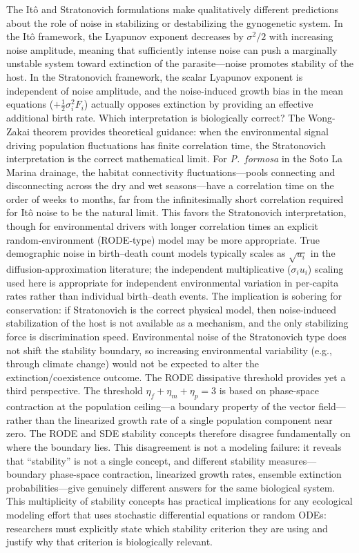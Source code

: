\documentclass[12pt]{article}
\begin{document}
The It\^{o} and Stratonovich formulations make qualitatively different predictions about the role of noise in stabilizing or destabilizing the gynogenetic system.  In the It\^{o} framework, the Lyapunov exponent decreases by $\sigma^2/2$ with increasing noise amplitude, meaning that sufficiently intense noise can push a marginally unstable system toward extinction of the parasite---noise promotes stability of the host.  In the Stratonovich framework, the scalar Lyapunov exponent is independent of noise amplitude, and the noise-induced growth bias in the mean equations ($+\tfrac{1}{2}\sigma_i^2 F_i$) actually opposes extinction by providing an effective additional birth rate.  Which interpretation is biologically correct?  The Wong-Zakai theorem provides theoretical guidance: when the environmental signal driving population fluctuations has finite correlation time, the Stratonovich interpretation is the correct mathematical limit.  For \textit{P.~formosa} in the Soto La Marina drainage, the habitat connectivity fluctuations---pools connecting and disconnecting across the dry and wet seasons---have a correlation time on the order of weeks to months, far from the infinitesimally short correlation required for It\^{o} noise to be the natural limit.  This favors the Stratonovich interpretation, though for environmental drivers with longer correlation times an explicit random-environment (RODE-type) model may be more appropriate.  True demographic noise in birth--death count models typically scales as $\sqrt{u_i}$ in the diffusion-approximation literature; the independent multiplicative ($\sigma_i u_i$) scaling used here is appropriate for independent environmental variation in per-capita rates rather than individual birth--death events.  The implication is sobering for conservation: if Stratonovich is the correct physical model, then noise-induced stabilization of the host is not available as a mechanism, and the only stabilizing force is discrimination speed.  Environmental noise of the Stratonovich type does not shift the stability boundary, so increasing environmental variability (e.g., through climate change) would not be expected to alter the extinction/coexistence outcome.  The RODE dissipative threshold provides yet a third perspective.  The threshold $\eta_f + \eta_m + \eta_p = 3$ is based on phase-space contraction at the population ceiling---a boundary property of the vector field---rather than the linearized growth rate of a single population component near zero.  The RODE and SDE stability concepts therefore disagree fundamentally on where the boundary lies.  This disagreement is not a modeling failure: it reveals that ``stability'' is not a single concept, and different stability measures---boundary phase-space contraction, linearized growth rates, ensemble extinction probabilities---give genuinely different answers for the same biological system.  This multiplicity of stability concepts has practical implications for any ecological modeling effort that uses stochastic differential equations or random ODEs: researchers must explicitly state which stability criterion they are using and justify why that criterion is biologically relevant.
\end{document}
